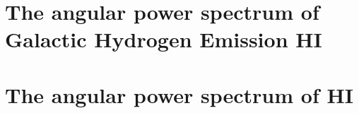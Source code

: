 {\section{The angular power spectrum of Galactic Hydrogen Emission HI}



\section{The angular power spectrum of HI}

























}











